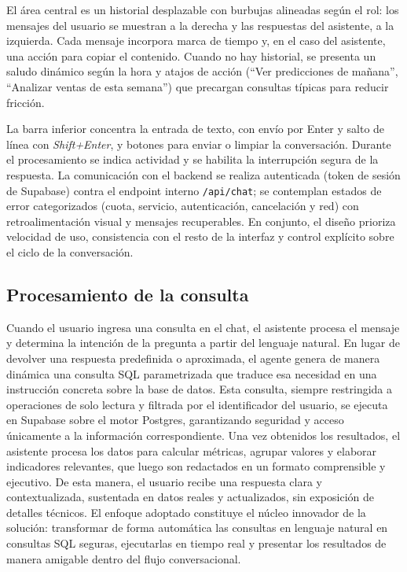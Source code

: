 El área central es un historial desplazable con burbujas alineadas según el rol: los mensajes del usuario se muestran a la derecha y las respuestas del asistente, a la izquierda. Cada mensaje incorpora marca de tiempo y, en el caso del asistente, una acción para copiar el contenido. Cuando no hay historial, se presenta un saludo dinámico según la hora y atajos de acción (“Ver predicciones de mañana”, “Analizar ventas de esta semana”) que precargan consultas típicas para reducir fricción.

La barra inferior concentra la entrada de texto, con envío por Enter y salto de línea con \textit{Shift+Enter}, y botones para enviar o limpiar la conversación. Durante el procesamiento se indica actividad y se habilita la interrupción segura de la respuesta. La comunicación con el backend se realiza autenticada (token de sesión de Supabase) contra el endpoint interno \texttt{/api/chat}; se contemplan estados de error categorizados (cuota, servicio, autenticación, cancelación y red) con retroalimentación visual y mensajes recuperables. En conjunto, el diseño prioriza velocidad de uso, consistencia con el resto de la interfaz y control explícito sobre el ciclo de la conversación.

\subsection{Procesamiento de la consulta}

Cuando el usuario ingresa una consulta en el chat, el asistente procesa el mensaje y determina la intención de la pregunta a partir del lenguaje natural. En lugar de devolver una respuesta predefinida o aproximada, el agente genera de manera dinámica una consulta SQL parametrizada que traduce esa necesidad en una instrucción concreta sobre la base de datos. Esta consulta, siempre restringida a operaciones de solo lectura y filtrada por el identificador del usuario, se ejecuta en Supabase sobre el motor Postgres, garantizando seguridad y acceso únicamente a la información correspondiente. Una vez obtenidos los resultados, el asistente procesa los datos para calcular métricas, agrupar valores y elaborar indicadores relevantes, que luego son redactados en un formato comprensible y ejecutivo. De esta manera, el usuario recibe una respuesta clara y contextualizada, sustentada en datos reales y actualizados, sin exposición de detalles técnicos. El enfoque adoptado constituye el núcleo innovador de la solución: transformar de forma automática las consultas en lenguaje natural en consultas SQL seguras, ejecutarlas en tiempo real y presentar los resultados de manera amigable dentro del flujo conversacional.



